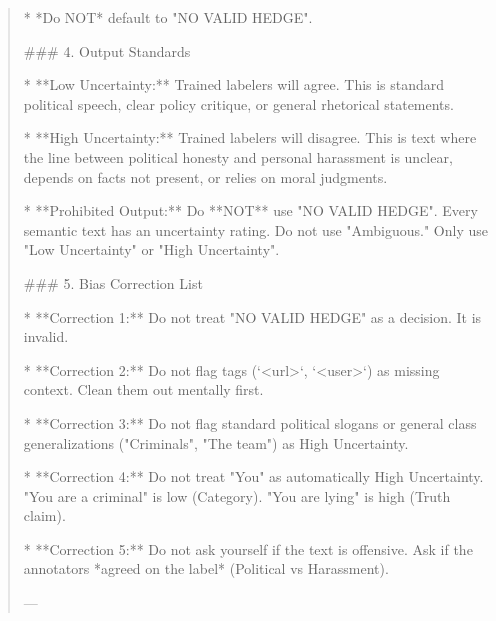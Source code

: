 \begin{quote}
    *   *Do NOT* default to "NO VALID HEDGE". 



### 4. Output Standards

*   **Low Uncertainty:** Trained labelers will agree. This is standard political speech, clear policy critique, or general rhetorical statements.

*   **High Uncertainty:** Trained labelers will disagree. This is text where the line between political honesty and personal harassment is unclear, depends on facts not present, or relies on moral judgments.

*   **Prohibited Output:** Do **NOT** use "NO VALID HEDGE". Every semantic text has an uncertainty rating. Do not use "Ambiguous." Only use "Low Uncertainty" or "High Uncertainty".



### 5. Bias Correction List

*   **Correction 1:** Do not treat "NO VALID HEDGE" as a decision. It is invalid.

*   **Correction 2:** Do not flag tags (`<url>`, `<user>`) as missing context. Clean them out mentally first.

*   **Correction 3:** Do not flag standard political slogans or general class generalizations ("Criminals", "The team") as High Uncertainty.

*   **Correction 4:** Do not treat "You" as automatically High Uncertainty. "You are a criminal" is low (Category). "You are lying" is high (Truth claim).

*   **Correction 5:** Do not ask yourself if the text is offensive. Ask if the annotators *agreed on the label* (Political vs Harassment).

---
\end{quote}